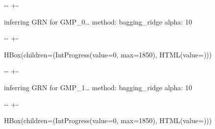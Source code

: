 \documentclass[letterpaper,10pt,english]{sphinxmanual}
\newlength\nbsphinxcodecellspacing
\begin{document}
%
{
\kern-\sphinxverbatimsmallskipamount\kern-\baselineskip
\kern+\FrameHeightAdjust\kern-\fboxrule
\vspace{\nbsphinxcodecellspacing}
%
\begin{sphinxVerbatim}[commandchars=\\\{\}]

inferring GRN for GMP\_0{\ldots}
method: bagging\_ridge
alpha: 10
\end{sphinxVerbatim}
}
\relax

{

\kern-\sphinxverbatimsmallskipamount\kern-\baselineskip
\kern+\FrameHeightAdjust\kern-\fboxrule
\vspace{\nbsphinxcodecellspacing}

%
\begin{sphinxVerbatim}[commandchars=\\\{\}]
HBox(children=(IntProgress(value=0, max=1850), HTML(value=\PYGZsq{}\PYGZsq{})))
\end{sphinxVerbatim}
}



%
{
\kern-\sphinxverbatimsmallskipamount\kern-\baselineskip
\kern+\FrameHeightAdjust\kern-\fboxrule
\vspace{\nbsphinxcodecellspacing}
%
\begin{sphinxVerbatim}[commandchars=\\\{\}]

inferring GRN for GMP\_1{\ldots}
method: bagging\_ridge
alpha: 10
\end{sphinxVerbatim}
}
\relax

{

\kern-\sphinxverbatimsmallskipamount\kern-\baselineskip
\kern+\FrameHeightAdjust\kern-\fboxrule
\vspace{\nbsphinxcodecellspacing}

%
\begin{sphinxVerbatim}[commandchars=\\\{\}]
HBox(children=(IntProgress(value=0, max=1850), HTML(value=\PYGZsq{}\PYGZsq{})))
\end{sphinxVerbatim}
}
\end{document}

